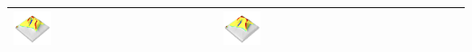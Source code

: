 \documentclass[prodmode,acmtochi]{acmsmall} %
\begin{document}
\begin{table}
{\begin{tabular}{m{} m{} m{} m{} m{}}
\includegraphics[width=0.19\textwidth]{images/render_3d/mean_forms_2.png} &
\includegraphics[width=0.19\textwidth]{images/render_3d/mean_forms_3.png}\\
%
\bottomrule
\end{tabular}}
\label{table:coupling_experiment} 
\end{table}
%

\end{document}

